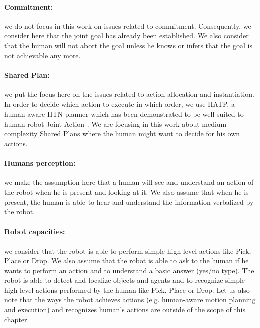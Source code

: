 \documentclass[english,a4paper,11pt,twoside]{StyleThese}
\begin{document}
\vspace{-10pt}
\paragraph{Commitment:} we do not focus in this work on issues related to commitment. Consequently, we consider here that the joint goal has already been established. We also consider that the human will not abort the goal unless he knows or infers that the goal is not achievable any more.

\vspace{-10pt}
\paragraph{Shared Plan:} we put the focus here on the issues related to action allocation and instantiation. In order to decide which action to execute in which order, we use HATP, a human-aware HTN planner which has been demonstrated to be well suited to human-robot Joint Action \cite{Lallement2014hatp}.
We are focusing in this work about medium complexity Shared Plans where the human might want to decide for his own actions.

\vspace{-10pt}
\paragraph{Humans perception:} we make the assumption here that a human will see and understand an action of the robot when he is present and looking at it. We also assume that when he is present, the human is able to hear and understand the information verbalized by the robot.

\vspace{-10pt}
\paragraph{Robot capacities:} we consider that the robot is able to perform simple high level actions like Pick, Place or Drop. We also assume that the robot is able to ask to the human if he wants to perform an action and to understand a basic answer (yes/no type). 
The robot is able to detect and localize objects and agents
and to recognize simple high level actions performed by the human like Pick, Place or Drop. Let us also note that the ways the robot achieves actions (e.g. human-aware motion planning and execution) and recognizes human's actions are outside of the scope of this chapter.
\vspace{-10pt}
\end{document}
